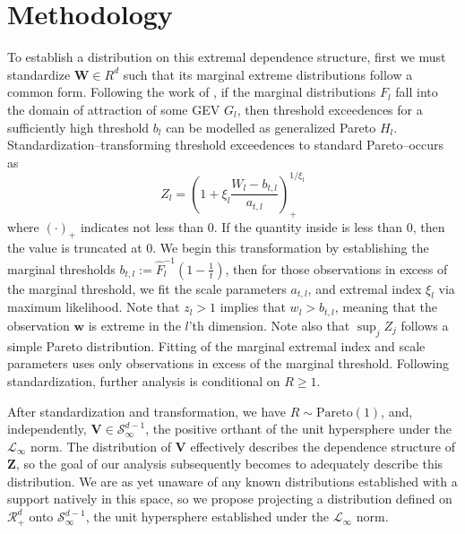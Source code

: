 \section{Methodology}
\label{sec:methodology}
To establish a distribution on this extremal dependence structure, first we must standardize $\bm{W} \in R^d$
  such that its marginal extreme distributions follow a common form.  Following the work of
  \cite{ferreira2014}, if the marginal distributions $F_{l}$ fall into the domain
  of attraction of some GEV $G_l$, then threshold exceedences for a sufficiently high threshold $b_{l}$
  can be modelled as generalized Pareto $H_l$.  Standardization--transforming threshold exceedences to
  standard Pareto--occurs as
  \begin{equation}
    \label{eqn:standardization}
    Z_l = \left(1 + \xi_l\frac{W_l - b_{t,l}}{a_{t,l}}\right)_{+}^{1/\xi_l}
  \end{equation}
  where $(\cdot)_{+}$ indicates not less than 0. If the quantity inside is less than 0, then the value
  is truncated at 0.  We begin this transformation by establishing the
  marginal thresholds $b_{t,l} := \hat{F}_l^{-1}\left(1 - \frac{1}{t}\right)$, then for those observations
  in excess of the marginal threshold, we fit the scale parameters $a_{t,l}$, and extremal index $\xi_l$
  via maximum likelihood. Note that $z_l > 1$ implies that $w_l > b_{t,l}$, meaning that the observation
  $\bm{w}$ is extreme in the $l$'th dimension.  Note also that $\sup_j Z_j$ follows a simple Pareto
  distribution. Fitting of the marginal extremal index and scale parameters uses only observations in
  excess of the marginal threshold. Following standardization, further analysis is conditional on
  $R \geq 1$.

After standardization and transformation, we have $R\sim\text{Pareto}(1)$, and, independently,
  $\bm{V}\in\mathcal{S}_{\infty}^{d-1}$, the positive orthant of the unit hypersphere under the
  $\mathcal{L}_{\infty}$ norm.  The distribution of $\bm{V}$ effectively describes the dependence
  structure of $\bm{Z}$, so the goal of our analysis subsequently becomes to adequately describe this
  distribution.  We are as yet unaware of any known distributions established with a support
  natively in this space, so we propose projecting a distribution defined on $\mathcal{R}_{+}^{d}$ onto
  $\mathcal{S}_{\infty}^{d-1}$, the unit hypersphere established under the $\mathcal{L}_{\infty}$ norm.









